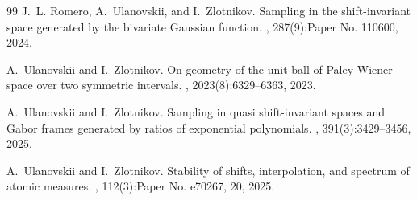 \documentclass[12pt]{amsart}
\numberwithin{equation}{section}
\theoremstyle{plain}
\theoremstyle{definition}
\begin{document}
\begin{thebibliography}{99}
J.~L. Romero, A.~Ulanovskii, and I.~Zlotnikov.
\newblock Sampling in the shift-invariant space generated by the bivariate {G}aussian function.
, 287(9):Paper No. 110600, 2024.

A.~Ulanovskii and I.~Zlotnikov.
\newblock On geometry of the unit ball of {P}aley-{W}iener space over two symmetric intervals.
, 2023(8):6329--6363, 2023.

A.~Ulanovskii and I.~Zlotnikov.
\newblock Sampling in quasi shift-invariant spaces and {G}abor frames generated by ratios of exponential polynomials.
, 391(3):3429--3456, 2025.

A.~Ulanovskii and I.~Zlotnikov.
\newblock Stability of shifts, interpolation, and spectrum of atomic measures.
, 112(3):Paper No. e70267, 20, 2025.

\end{thebibliography}

    
\end{document}

